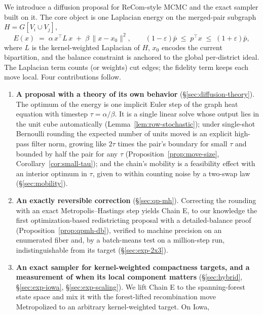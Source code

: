 \documentclass[11pt]{article}
\begin{document}
We introduce a diffusion proposal for ReCom-style MCMC and the exact
sampler built on it. The core object is one Laplacian energy on the
merged-pair subgraph $H = G[V_i \cup V_j]$,
\begin{equation}\label{eq:core-energy}
  E(x) \;=\; \alpha\, x^\top L\, x \;+\; \beta\, \|x - x_0\|^2,
  \qquad
  (1 - \varepsilon)\bar p \;\le\; p^\top x \;\le\; (1+\varepsilon)\bar p,
\end{equation}
where $L$ is the kernel-weighted Laplacian of $H$, $x_0$ encodes the
current bipartition, and the balance constraint is anchored to the
global per-district ideal. The Laplacian term counts (or weights) cut
edges; the fidelity term keeps each move local. Four contributions
follow.

\begin{enumerate}
  \item \textbf{A proposal with a theory of its own behavior}
    (\S\ref{sec:diffusion-theory}). The optimum of the energy is one
    implicit Euler step of the graph heat equation with timestep
    $\tau = \alpha/\beta$. It is a single linear solve whose output
    lies in the unit cube automatically (Lemma~\ref{lem:row-stochastic});
    under single-shot Bernoulli rounding the expected number of units
    moved is an explicit high-pass filter norm, growing like
    $2\tau$ times the pair's boundary for small $\tau$ and bounded by
    half the pair for any $\tau$ (Proposition~\ref{prop:move-size},
    Corollary~\ref{cor:small-tau}); and the chain's mobility is a
    feasibility effect with an interior optimum in $\tau$, given to
    within counting noise by a two-swap law (\S\ref{sec:mobility}).
  \item \textbf{An exactly reversible correction} (\S\ref{sec:qp-mh}).
    Correcting the rounding with an exact Metropolis--Hastings step
    yields Chain E, to our knowledge the first optimization-based
    redistricting proposal with a detailed-balance proof
    (Proposition~\ref{prop:qpmh-db}), verified to machine precision on
    an enumerated fiber and, by a batch-means test on a million-step
    run, indistinguishable from its target (\S\ref{sec:exp-2x3}).
  \item \textbf{An exact sampler for kernel-weighted compactness
    targets, and a measurement of when its local component matters}
    (\S\ref{sec:hybrid}, \S\ref{sec:exp-iowa}, \S\ref{sec:exp-scaling}).
    We lift Chain E to the spanning-forest state space and mix it with
    the forest-lifted recombination move~\cite{autry2023metropolized}
    Metropolized to an arbitrary kernel-weighted target. On Iowa,

\end{enumerate}
\end{document}
